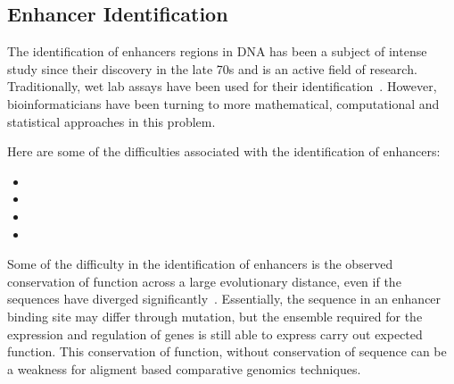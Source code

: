 
        


        
        \subsection{Enhancer Identification}
        
        The identification of enhancers regions in DNA has been a subject of intense study since their discovery in the late 70s and is an active field of research. Traditionally, wet lab assays have been used for their identification~\cite{rosenthal198772}. However, bioinformaticians have been turning to more mathematical, computational and statistical approaches in this problem. 

        Here are some of the difficulties associated with the identification of enhancers:
        	\begin{itemize}
        		\item 
        		\item
        		\item
        		\item 
        	\end{itemize}
        Some of the difficulty in the identification of enhancers is the observed conservation of function across a large evolutionary distance, even if the sequences have diverged significantly~\cite{tautz2000evolution}. Essentially, the sequence in an enhancer binding site may differ through mutation, but the ensemble required for the expression and regulation of genes is still able to express carry out expected function. This conservation of function, without conservation of sequence can be a weakness for aligment based comparative genomics techniques. 
        

